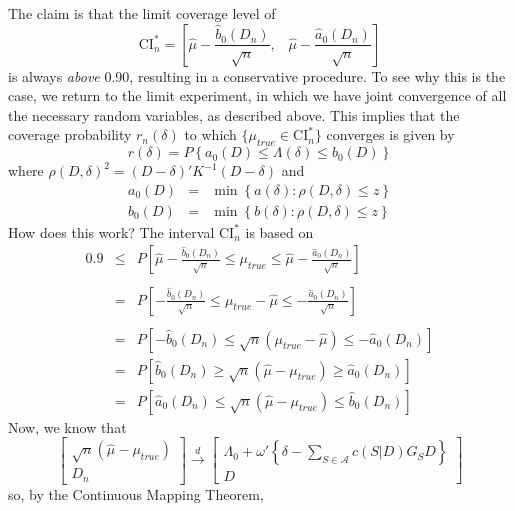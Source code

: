 The claim is that the limit coverage level of
	$$\mbox{CI}_n^* = \left[\widehat{\mu} - \frac{\widehat{b}_0(D_n)}{\sqrt{n}} , \;\;\; \widehat{\mu} - \frac{\widehat{a}_0(D_n)}{\sqrt{n}}  \right]$$
is always \emph{above} 0.90, resulting in a conservative procedure. To see why this is the case, we return to the limit experiment, in which we have joint convergence of all the necessary random variables, as described above. This implies that the coverage probability $r_n(\delta)$ to which $\{\mu_{true}\in \mbox{CI}_n^*\}$ converges is given by
	$$r(\delta) = P\left\{ a_0(D) \leq \Lambda(\delta) \leq b_0(D)\right\}$$
where $\rho(D,\delta)^2 = \left(D - \delta\right)' K^{-1}\left(D- \delta \right)$ and
		\begin{eqnarray*}
		a_0(D)&=&\min \left\{a(\delta)\colon \rho(D, \delta) \leq z\right\}\\
		b_0(D)&=&\min \left\{b(\delta)\colon \rho(D, \delta) \leq z\right\}
\end{eqnarray*}
How does this work? The interval $\mbox{CI}_n^*$ is based on 
		\begin{eqnarray*}	
0.9&\leq&P\left[ \widehat{\mu} - \frac{\widehat{b}_0(D_n)}{\sqrt{n}} \leq \mu_{true}\leq \widehat{\mu} - \frac{\widehat{a}_0(D_n)}{\sqrt{n}}  \right]\\\\
		&=& P\left[  - \frac{\widehat{b}_0(D_n)}{\sqrt{n}} \leq \mu_{true} - \widehat{\mu}\leq  - \frac{\widehat{a}_0(D_n)}{\sqrt{n}}  \right]\\\\
		&=& P\left[  - \widehat{b}_0(D_n) \leq \sqrt{n}\left(\mu_{true} - \widehat{\mu}\right)\leq  - \widehat{a}_0(D_n) \right]\\
		&=& P\left[ \widehat{b}_0(D_n) \geq \sqrt{n}\left( \widehat{\mu}-\mu_{true}\right)\geq  \widehat{a}_0(D_n) \right]\\
		&=& P\left[ \widehat{a}_0(D_n) \leq \sqrt{n}\left( \widehat{\mu}-\mu_{true}\right)\leq  \widehat{b}_0(D_n) \right]
\end{eqnarray*}
Now, we know that
	$$
	\left[\begin{array}{c}
		\sqrt{n}(\hat{\mu} - \mu_{true})\\
		D_n
\end{array}\right] \overset{d}{\rightarrow}
		\left[\begin{array}{c}
		\Lambda_0 + \omega' \left\{ \delta - \sum_{S \in \mathcal{A}}  c(S|D)G_S D \right\}\\
		D
\end{array}\right] 	
$$
so, by the Continuous Mapping Theorem,
